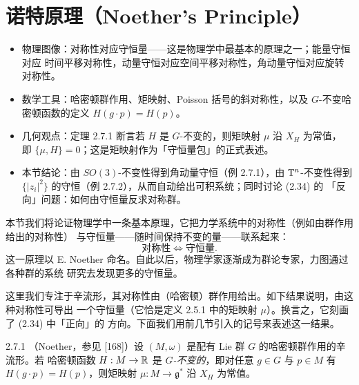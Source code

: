 \section{诺特原理（Noether's Principle）}

\begin{keytakeaways}
\begin{itemize}
  \item 物理图像：对称性对应守恒量——这是物理学中最基本的原理之一；能量守恒对应
        时间平移对称性，动量守恒对应空间平移对称性，角动量守恒对应旋转对称性。
  \item 数学工具：哈密顿群作用、矩映射、Poisson 括号的斜对称性，以及
        $G$-不变哈密顿函数的定义 $H(g\cdot p)=H(p)$。
  \item 几何观点：定理 2.7.1 断言若 $H$ 是 $G$-不变的，则矩映射 $\mu$ 沿 $X_H$ 为常值，
        即 $\{\mu,H\}=0$；这是矩映射作为「守恒量包」的正式表述。
  \item 本节结论：由 $SO(3)$-不变性得到角动量守恒（例 2.7.1），由 $\mathbb{T}^n$-不变性得到
        $\{|z_i|^2\}$ 的守恒（例 2.7.2），从而自动给出可积系统；同时讨论 (2.34) 的
        「反向」问题：如何由守恒量反求对称群。
\end{itemize}
\end{keytakeaways}

本节我们将论证物理学中一条基本原理，它把力学系统中的对称性（例如由群作用给出的对称性）
与守恒量——随时间保持不变的量——联系起来：
\begin{equation}
  \text{对称性}\iff\text{守恒量}.
  \tag{2.34}
\end{equation}
这一原理以 E. Noether 命名。自此以后，物理学家逐渐成为群论专家，力图通过各种群的系统
研究去发现更多的守恒量。

这里我们专注于辛流形，其对称性由（哈密顿）群作用给出。如下结果说明，由这种对称性可导出
一个守恒量（它恰是定义 2.5.1 中的矩映射 $\mu$）。换言之，它刻画了 (2.34) 中「正向」的
方向。下面我们用前几节引入的记号来表述这一结果。

\begin{wthm}{2.7.1}
（Noether，参见 [168]）设 $(M,\omega)$ 是配有 Lie 群 $G$ 的哈密顿群作用的辛流形。若
哈密顿函数 $H:M\to\mathbb{R}$ 是 \emph{$G$-不变的}，即对任意 $g\in G$ 与 $p\in M$ 有
$H(g\cdot p)=H(p)$，则矩映射 $\mu:M\to\mathfrak{g}^*$ 沿 $X_H$ 为常值。
\end{wthm}

